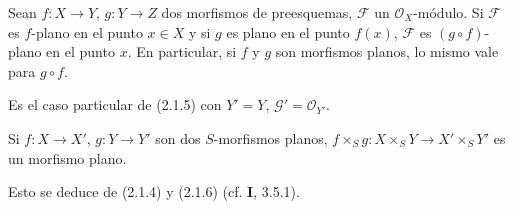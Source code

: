 \begin{corollary}[2.1.6]
\label{IV.2.1.6-fr}
Sean $f:X\to Y$, $g:Y\to Z$ dos morfismos de preesquemas, $\mathscr F$ un
$\mathcal O_X$-módulo. Si $\mathscr F$ es $f$-plano en el punto $x\in X$ y si
$g$ es plano en el punto $f(x)$, $\mathscr F$ es $(g\circ f)$-plano en el punto $x$. En
particular, si $f$ y $g$ son morfismos planos, lo mismo vale para
$g\circ f$.
\end{corollary}

Es el caso particular de (2.1.5) con $Y'=Y$, $\mathscr G'=\mathcal O_{Y'}$.

\begin{corollary}[2.1.7]
\label{IV.2.1.7-fr}
Si $f:X\to X'$, $g:Y\to Y'$ son dos $S$-morfismos planos,
$f\times_S g:X\times_S Y\to X'\times_S Y'$ es un morfismo plano.
\end{corollary}

Esto se deduce de (2.1.4) y (2.1.6) (cf. \textbf I, 3.5.1).

